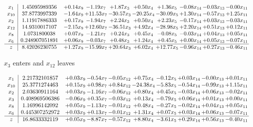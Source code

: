 \documentclass[9pt]{article}
\begin{document}
 \[\begin{array}{c| c c@{\hskip 2pt} c@{\hskip 2pt} c@{\hskip 2pt} c@{\hskip 2pt} c@{\hskip 2pt} c@{\hskip 2pt} c@{\hskip 2pt} c@{\hskip 2pt} }
 x_{1}   &  1.45095989356 & +  0.14 x_{9} & -1.19 x_{7} & +  1.87 x_{3} & +  0.50 x_{4} & +  1.36 x_{5} & -0.08 x_{14} & -0.03 x_{13} & -0.00 x_{11}\\
 x_{10}   &  37.8773997339 & -1.64 x_{9} & + 11.53 x_{7} & -30.57 x_{3} & -20.25 x_{4} & -30.09 x_{5} & +  1.30 x_{14} & -0.57 x_{13} & +  1.25 x_{11}\\
 x_{2}   &  1.11917886333 & +  0.17 x_{9} & -1.94 x_{7} & +  2.24 x_{3} & +  0.50 x_{4} & +  2.23 x_{5} & -0.17 x_{14} & +  0.03 x_{13} & -0.03 x_{11}\\
 x_{12}   &  14.9310017107 & -2.15 x_{9} & + 12.60 x_{7} & -36.51 x_{3} & +  4.92 x_{4} & -28.98 x_{5} & +  2.20 x_{14} & +  0.51 x_{13} & +  0.12 x_{11}\\
 x_{8}   &  1.0731800038 & +  0.07 x_{9} & -1.21 x_{7} & +  0.24 x_{3} & +  0.45 x_{4} & -0.08 x_{5} & -0.03 x_{14} & +  0.04 x_{13} & +  0.05 x_{11}\\
 x_{6}   &  0.248907051891 & +  0.06 x_{9} & -0.03 x_{7} & +  0.48 x_{3} & +  1.24 x_{4} & +  0.45 x_{5} & +  0.00 x_{14} & +  0.05 x_{13} & -0.07 x_{11}\\
\hline
z    &  8.42026230755 & +  1.27 x_{9} & -15.99 x_{7} & + 20.64 x_{3} & +  6.02 x_{4} & + 12.77 x_{5} & -0.96 x_{14} & +  0.27 x_{13} & -0.46 x_{11}\\
\end{array}\]


 $ x_{3} $ enters and $ x_{12} $ leaves 

 \[\begin{array}{c| c c@{\hskip 2pt} c@{\hskip 2pt} c@{\hskip 2pt} c@{\hskip 2pt} c@{\hskip 2pt} c@{\hskip 2pt} c@{\hskip 2pt} c@{\hskip 2pt} }
 x_{1}   &  2.21732101857 & +  0.03 x_{9} & -0.54 x_{7} & -0.05 x_{12} & +  0.75 x_{4} & -0.12 x_{5} & +  0.03 x_{14} & -0.00 x_{13} & +  0.01 x_{11}\\
 x_{10}   &  25.3771274463 & +  0.15 x_{9} & +  0.98 x_{7} & +  0.84 x_{12} & -24.38 x_{4} & -5.83 x_{5} & -0.54 x_{14} & -0.99 x_{13} & +  1.15 x_{11}\\
 x_{2}   &  2.03630911164 & +  0.03 x_{9} & -1.16 x_{7} & -0.06 x_{12} & +  0.80 x_{4} & +  0.45 x_{5} & -0.03 x_{14} & +  0.06 x_{13} & -0.02 x_{11}\\
 x_{3}   &  0.408969506386 & -0.06 x_{9} & +  0.35 x_{7} & -0.03 x_{12} & +  0.13 x_{4} & -0.79 x_{5} & +  0.06 x_{14} & +  0.01 x_{13} & +  0.00 x_{11}\\
 x_{8}   &  1.16996142092 & +  0.05 x_{9} & -1.13 x_{7} & -0.01 x_{12} & +  0.48 x_{4} & -0.27 x_{5} & -0.02 x_{14} & +  0.04 x_{13} & +  0.05 x_{11}\\
 x_{6}   &  0.445307252972 & +  0.03 x_{9} & +  0.13 x_{7} & -0.01 x_{12} & +  1.31 x_{4} & +  0.07 x_{5} & +  0.03 x_{14} & +  0.06 x_{13} & -0.07 x_{11}\\
\hline
z    &  16.8633332119 & +  0.05 x_{9} & -8.87 x_{7} & -0.57 x_{12} & +  8.80 x_{4} & -3.61 x_{5} & +  0.29 x_{14} & +  0.56 x_{13} & -0.40 x_{11}\\
\end{array}\]
\end{document}
